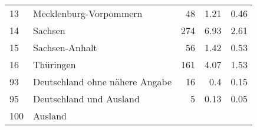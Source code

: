 \begin{longtable}{lXrrr}
     13 &
     \multicolumn{1}{X}{ Mecklenburg-Vorpommern   } &


       \num{48} &
       \num[round-mode=places,round-precision=2]{1.21} &
         \num[round-mode=places,round-precision=2]{0.46} \\

     14 &
     \multicolumn{1}{X}{ Sachsen   } &


       \num{274} &
       \num[round-mode=places,round-precision=2]{6.93} &
         \num[round-mode=places,round-precision=2]{2.61} \\

     15 &
     \multicolumn{1}{X}{ Sachsen-Anhalt   } &


       \num{56} &
       \num[round-mode=places,round-precision=2]{1.42} &
         \num[round-mode=places,round-precision=2]{0.53} \\

     16 &
     \multicolumn{1}{X}{ Thüringen   } &


       \num{161} &
       \num[round-mode=places,round-precision=2]{4.07} &
         \num[round-mode=places,round-precision=2]{1.53} \\

     93 &
     \multicolumn{1}{X}{ Deutschland ohne nähere Angabe   } &


       \num{16} &
       \num[round-mode=places,round-precision=2]{0.4} &
         \num[round-mode=places,round-precision=2]{0.15} \\

     95 &
     \multicolumn{1}{X}{ Deutschland und Ausland   } &


       \num{5} &
       \num[round-mode=places,round-precision=2]{0.13} &
         \num[round-mode=places,round-precision=2]{0.05} \\

     100 &
     \multicolumn{1}{X}{ Ausland   } &



\end{longtable}
